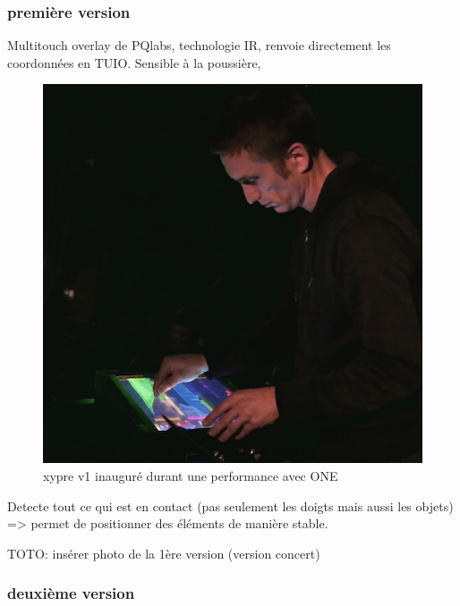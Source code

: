 \subsubsection{première version}
Multitouch overlay de PQlabs, technologie IR, renvoie directement les coordonnées en TUIO. Sensible à la poussière,
\begin{figure}[!htbp]
	\includegraphics[width=\textwidth]{gfx/05_interfaces/xypre-v1_72dpi.jpg}
	\caption{xypre v1 inauguré durant une performance avec ONE}
	\label{fig:interface:xyprev1_jeu}
\end{figure}

Detecte tout ce qui est en contact (pas seulement les doigts mais aussi les objets) => permet de positionner des éléments de manière stable.

TOTO: insérer photo de la 1ère version (version concert)

\subsubsection{deuxième version}

